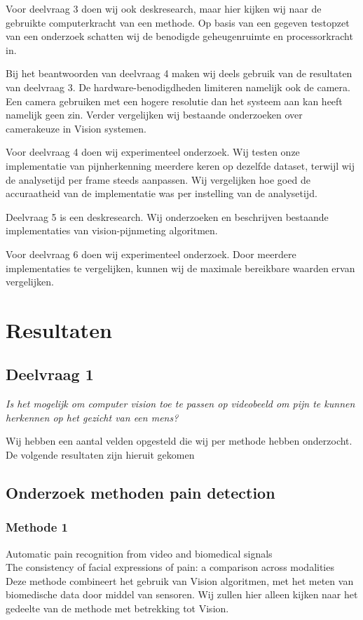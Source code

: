 \documentclass[11pt]{article}
\begin{document}
    Voor deelvraag 3 doen wij ook deskresearch, maar hier kijken wij naar de gebruikte computerkracht van een methode.
    Op basis van een gegeven testopzet van een onderzoek schatten wij de benodigde geheugenruimte en processorkracht in.

    Bij het beantwoorden van deelvraag 4 maken wij deels gebruik van de resultaten van deelvraag 3.
    De hardware-benodigdheden limiteren namelijk ook de camera.
    Een camera gebruiken met een hogere resolutie dan het systeem aan kan heeft namelijk geen zin.
    Verder vergelijken wij bestaande onderzoeken over camerakeuze in Vision systemen.

    Voor deelvraag 4 doen wij experimenteel onderzoek.
    Wij testen onze implementatie van pijnherkenning meerdere keren op dezelfde dataset, terwijl wij de analysetijd per frame steeds aanpassen.
    Wij vergelijken hoe goed de accuraatheid van de implementatie was per instelling van de analysetijd.

    Deelvraag 5 is een deskresearch.
    Wij onderzoeken en beschrijven bestaande implementaties van vision-pijnmeting algoritmen.

    Voor deelvraag 6 doen wij experimenteel onderzoek.
    Door meerdere implementaties te vergelijken, kunnen wij de maximale bereikbare waarden ervan vergelijken.


    \section{Resultaten}

    \subsection{Deelvraag 1}
    \emph{Is het mogelijk om computer vision toe te passen op videobeeld om pijn te kunnen herkennen op het gezicht van een mens?}

    Wij hebben een aantal velden opgesteld die wij per methode hebben onderzocht. De volgende resultaten zijn hieruit gekomen
    \subsection{Onderzoek methoden pain detection}

    \subsubsection{Methode 1}

    \emph{\citet{werner2014automatic}} Automatic pain recognition from video and biomedical signals\\
    \emph{\citet{prkachin1992consistency}} The consistency of facial expressions of pain: a comparison across modalities\\
    Deze methode combineert het gebruik van Vision algoritmen, met het meten van biomedische data door middel van sensoren.
    Wij zullen hier alleen kijken naar het gedeelte van de methode met betrekking tot Vision.
\end{document}
